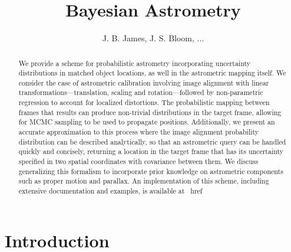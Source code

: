 \documentclass[manuscript]{aastex}
\newcommand{\asidebox}[1]{\begin{shaded}
{
\begin{picture}(0,0)(0,0)
      \put(-20,-3){\makebox(0,0){%
	  \scalebox{7}{\textcolor{quotemark}{\bfseries``}}}%
      }
    \end{picture}
   \textbf{Berian}: ``#1'' }
\end{shaded}
}
\begin{document}
\title{Bayesian Astrometry}
\author{J. B. James, J. S. Bloom, $\ldots$}

\begin{abstract}
We provide a scheme for probabilistic astrometry incorporating uncertainty distributions in matched object locations, as well in the astrometric mapping itself. We consider the case of astrometric calibration involving image alignment with linear transformations---translation, scaling and rotation---followed by non-parametric regression to account for localized distortions. The probabilistic mapping between frames that results can produce non-trivial distributions in the target frame, allowing for MCMC sampling to be used to propagate positions. Additionally, we present an accurate approximation to this process where the image alignment probability distribution can be described analytically, so that an astrometric query can be handled quickly and concisely, returning a location in the target frame that has its uncertainty specified in two spatial coordinates with covariance between them. We discuss generalizing this formalism to incorporate prior knowledge on astrometric components such as proper motion and parallax. An implementation of this scheme, including extensive documentation and examples, is available at \
href{}{}
\end{abstract}

\keywords{}


\section{Introduction}
\end{document}
